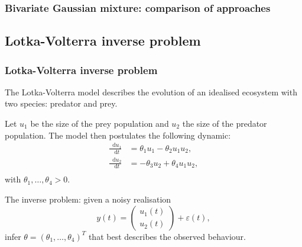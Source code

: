 \documentclass{beamer}
\newcommand*\diff{\mathop{}\!\mathrm{d}}
\begin{document}
\begin{frame}
\frametitle{Bivariate Gaussian mixture: comparison of approaches}

\begin{figure}[h]
\centering
{}
\end{figure}

\end{frame}

\subsection{Lotka-Volterra inverse problem}

\begin{frame}
\frametitle{Lotka-Volterra inverse problem}

The Lotka-Volterra model describes the evolution of an idealised ecosystem with two species: predator and prey.

Let $u_1$ be the size of the prey population and $u_2$ the size of the predator population. The model then postulates the following dynamic:
\begin{equation*}
\begin{aligned}
\frac{\diff u_1}{\diff t} & = \theta_1 u_1 - \theta_2 u_1 u_2, \\
\frac{\diff u_2}{\diff t} & = -\theta_3 u_2 + \theta_4 u_1 u_2, \\
\end{aligned}
\end{equation*}
with $\theta_1, \dots, \theta_4 > 0$.

The inverse problem: given a noisy realisation
\begin{equation*}
y(t) = \begin{pmatrix}
u_1(t) \\ u_2(t)
\end{pmatrix}
+ \varepsilon(t),
\end{equation*}
infer $\theta = (\theta_1, \dots, \theta_4)^T$ that best describes the observed behaviour.

\end{frame}
\end{document}
